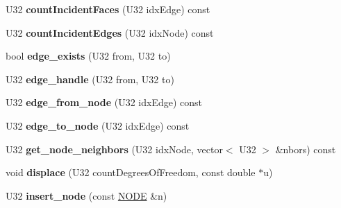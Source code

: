 \begin{DoxyCompactItemize}
\item 
\hypertarget{classps_1_1elastic_1_1VolMesh_a8952131069dcf8c966e0d257708a8679}{}U32 {\bfseries count\+Incident\+Faces} (U32 idx\+Edge) const \label{classps_1_1elastic_1_1VolMesh_a8952131069dcf8c966e0d257708a8679}

\item 
\hypertarget{classps_1_1elastic_1_1VolMesh_a7caf2554abe121c2afb761facc784364}{}U32 {\bfseries count\+Incident\+Edges} (U32 idx\+Node) const \label{classps_1_1elastic_1_1VolMesh_a7caf2554abe121c2afb761facc784364}

\item 
\hypertarget{classps_1_1elastic_1_1VolMesh_ae9f65f3caa6d8079dd2af8f87e165fa0}{}bool {\bfseries edge\+\_\+exists} (U32 from, U32 to)\label{classps_1_1elastic_1_1VolMesh_ae9f65f3caa6d8079dd2af8f87e165fa0}

\item 
\hypertarget{classps_1_1elastic_1_1VolMesh_a81b08888ae16c8bfc6e0a600045911a6}{}U32 {\bfseries edge\+\_\+handle} (U32 from, U32 to)\label{classps_1_1elastic_1_1VolMesh_a81b08888ae16c8bfc6e0a600045911a6}

\item 
\hypertarget{classps_1_1elastic_1_1VolMesh_a693b256705ed37a34c376a6d8ee64077}{}U32 {\bfseries edge\+\_\+from\+\_\+node} (U32 idx\+Edge) const \label{classps_1_1elastic_1_1VolMesh_a693b256705ed37a34c376a6d8ee64077}

\item 
\hypertarget{classps_1_1elastic_1_1VolMesh_a44b29ea290f6ccde40c9915a332194c2}{}U32 {\bfseries edge\+\_\+to\+\_\+node} (U32 idx\+Edge) const \label{classps_1_1elastic_1_1VolMesh_a44b29ea290f6ccde40c9915a332194c2}

\item 
\hypertarget{classps_1_1elastic_1_1VolMesh_af388dbb76bd8a002001dfb6ed84cb9b3}{}U32 {\bfseries get\+\_\+node\+\_\+neighbors} (U32 idx\+Node, vector$<$ U32 $>$ \&nbors) const \label{classps_1_1elastic_1_1VolMesh_af388dbb76bd8a002001dfb6ed84cb9b3}

\item 
\hypertarget{classps_1_1elastic_1_1VolMesh_ab089dca62b3a7fe26f925d9fe3dd6672}{}void {\bfseries displace} (U32 count\+Degrees\+Of\+Freedom, const double $\ast$u)\label{classps_1_1elastic_1_1VolMesh_ab089dca62b3a7fe26f925d9fe3dd6672}

\item 
\hypertarget{classps_1_1elastic_1_1VolMesh_a02cf4f39e82f844d1280245e1ebcab83}{}U32 {\bfseries insert\+\_\+node} (const \hyperlink{classps_1_1elastic_1_1NODE}{N\+O\+D\+E} \&n)\label{classps_1_1elastic_1_1VolMesh_a02cf4f39e82f844d1280245e1ebcab83}


\end{DoxyCompactItemize}

